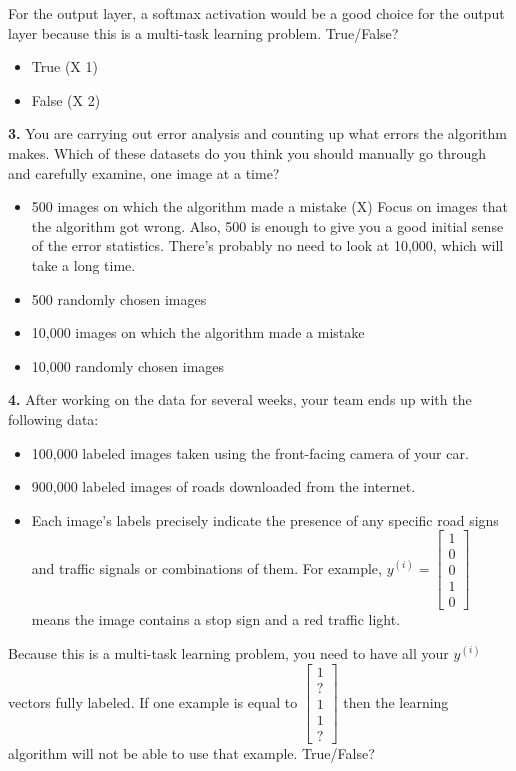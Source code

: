 For the output layer, a softmax activation would be a good choice for the output layer because this is a multi-task learning problem. True/False?
\begin{itemize}
    \item True (X 1)
    \item False (X 2)
\end{itemize}
\textbf{3.} You are carrying out error analysis and counting up what errors the algorithm makes. Which of these datasets do you think you should manually go through and carefully examine, one image at a time?
\begin{itemize}
    \item 500 images on which the algorithm made a mistake (X) Focus on images that the algorithm got wrong. Also, 500 is enough to give you a good initial sense of the error statistics. There’s probably no need to look at 10,000, which will take a long time.
    \item 500 randomly chosen images
    \item 10,000 images on which the algorithm made a mistake
    \item 10,000 randomly chosen images
\end{itemize}
\textbf{4.} After working on the data for several weeks, your team ends up with the following data:
\begin{itemize}
    \item 100,000 labeled images taken using the front-facing camera of your car.
    \item 900,000 labeled images of roads downloaded from the internet.
    \item Each image’s labels precisely indicate the presence of any specific road signs and traffic signals or combinations of them. For example, $y^{(i)} = \begin{bmatrix}
           1 \\
           0 \\
           0 \\
           1 \\
           0
         \end{bmatrix}$ means the image contains a stop sign and a red traffic light.
\end{itemize}
Because this is a multi-task learning problem, you need to have all your $y^{(i)}$
  vectors fully labeled. If one example is equal to $\begin{bmatrix}
           1 \\
           ? \\
           1 \\
           1 \\
           ?
         \end{bmatrix}$ then the learning algorithm will not be able to use that example. True/False?
